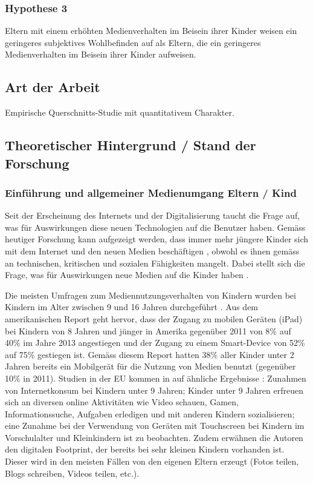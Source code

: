 \subsubsection{Hypothese 3}
Eltern mit einem erhöhten Medienverhalten im Beisein ihrer Kinder weisen ein geringeres subjektives Wohlbefinden auf als Eltern, die ein geringeres Medienverhalten im Beisein ihrer Kinder aufweisen.
\subsection{Art der Arbeit}
Empirische Querschnitts-Studie mit quantitativem Charakter.

\subsection{Theoretischer Hintergrund / Stand der Forschung}
\subsubsection{Einführung und allgemeiner Medienumgang Eltern / Kind}
Seit der Erscheinung des Internets und der Digitalisierung taucht die Frage auf, was für Auswirkungen diese neuen Technologien auf die Benutzer haben. Gemäss heutiger Forschung kann aufgezeigt werden, dass immer mehr jüngere Kinder sich mit dem Internet und den neuen Medien beschäftigen \cite{Rideout2013a, Chaudron2015}, obwohl es ihnen gemäss  an technischen, kritischen und sozialen Fähigkeiten mangelt. Dabei stellt sich die Frage, was für Auswirkungen neue Medien auf die Kinder haben \cite{Tomopoulos2010, Pempek2014, Livingstone2015, Masur2015, Troseth2016}. 

Die meisten Umfragen zum Mediennutzungsverhalten von Kindern wurden bei Kindern im Alter zwischen 9 und 16 Jahren durchgeführt \cite{Chaudron2015}. Aus dem amerikanischen Report  geht hervor, dass der Zugang zu mobilen Geräten (iPad) bei Kindern von 8 Jahren und jünger in Amerika gegenüber 2011 von 8\% auf 40\% im Jahre 2013 angestiegen und der Zugang zu einem Smart-Device von 52\% auf 75\% gestiegen ist. Gemäss diesem Report hatten 38\% aller Kinder unter 2 Jahren bereits ein Mobilgerät für die Nutzung von Medien benutzt (gegenüber 10\% in 2011). Studien in der EU kommen in auf ähnliche Ergebnisse \cite{Holloway2013}: Zunahmen von Internetkonsum bei Kindern unter 9 Jahren; Kinder unter 9 Jahren erfreuen sich an diversen online Aktivitäten wie Video schauen, Gamen, Informationssuche, Aufgaben erledigen und mit anderen Kindern sozialisieren; eine Zunahme bei der Verwendung von Geräten mit Touchscreen bei Kindern im Vorschulalter und Kleinkindern ist zu beobachten. Zudem erwähnen die Autoren den digitalen Footprint, der bereits bei sehr kleinen Kindern vorhanden ist. Dieser wird in den meisten Fällen von den eigenen Eltern erzeugt (Fotos teilen, Blogs schreiben, Videos teilen, etc.).


